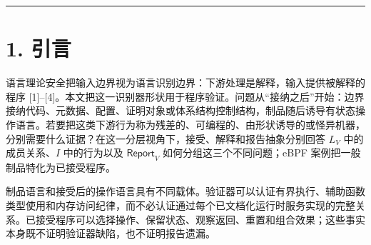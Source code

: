 \documentclass[
  11pt,
  a4paper,
]{ctexart}
\begin{document}
\begin{center}\rule{0.5\linewidth}{0.5pt}\end{center}

\hypertarget{1-ux5f15ux8a00}{%
\section{1. 引言}\label{1-ux5f15ux8a00}}

语言理论安全把输入边界视为语言识别边界：下游处理是解释，输入提供被解释的程序
{[}1{]}--{[}4{]}。本文把这一识别器形状用于程序验证。问题从``接纳之后''开始：边界接纳代码、元数据、配置、证明对象或体系结构控制结构，制品随后诱导有状态操作语言。若要把这类下游行为称为残差的、可编程的、由形状诱导的或怪异机器，分别需要什么证据？在这一分层视角下，接受、解释和报告抽象分别回答
\(L_V\) 中的成员关系、\(I\) 中的行为以及 \(\mathsf{Report}_V\)
如何分组这三个不同问题；eBPF 案例把一般制品特化为已接受程序。

制品语言和接受后的操作语言具有不同载体。验证器可以认证有界执行、辅助函数类型使用和内存访问纪律，而不必认证通过每个已文档化运行时服务实现的完整关系。已接受程序可以选择操作、保留状态、观察返回、重置和组合效果；这些事实本身既不证明验证器缺陷，也不证明报告遗漏。
\end{document}
